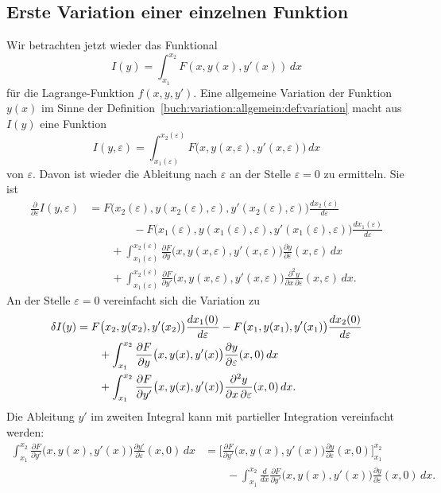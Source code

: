 \subsection{Erste Variation einer einzelnen Funktion
\label{buch:variation:allgemein:subsection:var1}}
Wir betrachten jetzt wieder das Funktional
\[
I(y)
=
\int_{x_1}^{x_2} F(x,y(x),y'(x)) \,dx
\]
für die Lagrange-Funktion $f(x,y,y')$.
Eine allgemeine Variation der Funktion $y(x)$ im Sinne der
Definition~\ref{buch:variation:allgemein:def:variation} macht aus
$I(y)$ eine Funktion 
\[
I(y,\varepsilon)
=
\int_{x_1(\varepsilon)}^{x_2(\varepsilon)}
F\bigl(x,y(x,\varepsilon),y'(x,\varepsilon)\bigr)
\,dx
\]
von $\varepsilon$.
Davon ist wieder die Ableitung nach $\varepsilon$ an der Stelle
$\varepsilon=0$ zu ermitteln.
Sie ist
\begin{align*}
\frac{\partial}{\partial\varepsilon}I(y,\varepsilon)
&=
F\bigl(x_2(\varepsilon),y(x_2(\varepsilon),\varepsilon),
y'(x_2(\varepsilon),\varepsilon)\bigr)
\frac{dx_2(\varepsilon)}{d\varepsilon}
\\
&\qquad\qquad
-
F\bigl(x_1(\varepsilon),y(x_1(\varepsilon),\varepsilon),
y'(x_1(\varepsilon),\varepsilon)\bigr)
\frac{dx_1(\varepsilon)}{d\varepsilon}
\\
&\qquad
+
\int_{x_1(\varepsilon)}^{x_2(\varepsilon)}
\frac{\partial F}{\partial y}\bigl(x, y(x,\varepsilon), y'(x,\varepsilon)\bigr)
\frac{\partial y}{\partial \varepsilon}(x,\varepsilon)
\,dx
\\
&\qquad
+
\int_{x_1(\varepsilon)}^{x_2(\varepsilon)}
\frac{\partial F}{\partial y'}\bigl(x, y(x,\varepsilon), y'(x,\varepsilon)\bigr)
\frac{\partial^2 y}{\partial x\,\partial\varepsilon}(x,\varepsilon)
\,dx.
\end{align*}
An der Stelle $\varepsilon=0$ vereinfacht sich die Variation zu
\begin{align}
\delta I(y)
&=
F\bigl(x_2,y(x_2),y'(x_2)\bigr)
\frac{dx_1(0)}{d\varepsilon}
-
F\bigl(x_1,y(x_1),y'(x_1)\bigr)
\frac{dx_2(0)}{d\varepsilon}
\notag
\\
&\qquad
+
\int_{x_1}^{x_2}
\frac{\partial F}{\partial y}\bigl(x,y(x),y'(x)\bigr)
\frac{\partial y}{\partial \varepsilon}(x,0)
\,dx
\notag
\\
&\qquad
+
\int_{x_1}^{x_2}
\frac{\partial F}{\partial y'}\bigl(x,y(x),y'(x)\bigr)
\frac{\partial^2 y}{\partial x\,\partial\varepsilon}(x,0)
\,dx.
\label{buch:variation:allgemein:eqn:var1}
\end{align}
Die Ableitung $y'$ im zweiten Integral kann mit partieller Integration 
vereinfacht werden:
\begin{align*}
\int_{x_1}^{x_2}
\frac{\partial F}{\partial y'}\bigl(x,y(x),y'(x)\bigr)
\frac{\partial y'}{\partial \varepsilon}(x,0)
\,dx
&=
\biggl[
\frac{\partial F}{\partial y'}\bigl(x,y(x),y'(x)\bigr)
\frac{\partial y}{\partial\varepsilon}(x,0)
\biggr]_{x_1}^{x_2}
\\
&\qquad
-
\int_{x_1}^{x_2}
\frac{d}{dx}
\frac{\partial F}{\partial y'}\bigl(x,y(x),y'(x)\bigr)
\frac{\partial y}{\partial\varepsilon}(x,0)
\,dx.
\end{align*}
